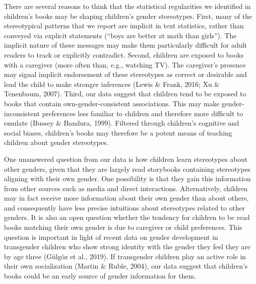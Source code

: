 \documentclass[
  english,
  ,man,floatsintext]{apa6}
\begin{document}
There are several reasons to think that the statistical regularities we identified in children's books may be shaping children's gender stereotypes. First, many of the stereotypical patterns that we report are implicit in text statistics, rather than conveyed via explicit statements (``boys are better at math than girls''). The implicit nature of these messages may make them particularly difficult for adult readers to track or explicitly contradict. Second, children are exposed to books with a caregiver (more often than, e.g., watching TV). The caregiver's presence may signal implicit endorsement of these stereotypes as correct or desirable and lead the child to make stronger inferences (Lewis \& Frank, 2016; Xu \& Tenenbaum, 2007). Third, our data suggest that children tend to be exposed to books that contain own-gender-consistent associations. This may make gender-inconsistent preferences less familiar to children and therefore more difficult to emulate (Bussey \& Bandura, 1999). Filtered through children's cognitive and social biases, children's books may therefore be a potent means of teaching children about gender stereotypes.

One unanswered question from our data is how children learn stereotypes about other genders, given that they are largely read storybooks containing stereotypes aligning with their own gender. One possibility is that they gain this information from other sources such as media and direct interactions. Alternatively, children may in fact receive more information about their own gender than about others, and consequently have less precise intuitions about stereotypes related to other genders. It is also an open question whether the tendency for children to be read books matching their own gender is due to caregiver or child preferences. This question is important in light of recent data on gender development in transgender children who show strong identity with the gender they feel they are by age three (Gülgöz et al., 2019). If transgender children play an active role in their own socialization (Martin \& Ruble, 2004), our data suggest that children's books could be an early source of gender information for them.
\end{document}

